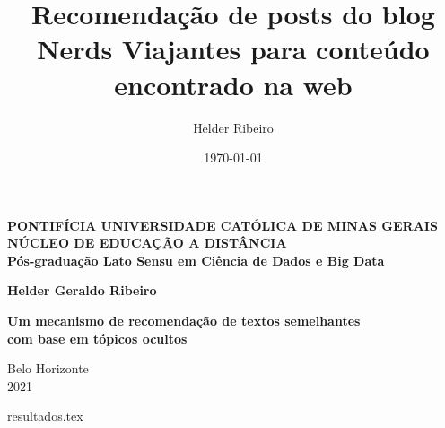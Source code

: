 \documentclass{article}
\title{Recomendação de posts do blog Nerds Viajantes para conteúdo encontrado na web}
\author{Helder Ribeiro}
\date{\today}
\begin{document}

\begin{comment}
\maketitle
\end{comment}

\begin{titlepage}
    \begin{center}
        \vspace*{1cm}

        \large
        \textbf{PONTIFÍCIA UNIVERSIDADE CATÓLICA DE MINAS GERAIS} \\
        \textbf{NÚCLEO DE EDUCAÇÃO A DISTÂNCIA} \\
        \textbf{Pós-graduação Lato Sensu em Ciência de Dados e Big Data} \\
 
        \vspace{2.5cm}
 
        \textbf{Helder Geraldo Ribeiro}
  
        \vspace{1.5cm}
             
        \textbf{Um mecanismo de recomendação de textos semelhantes} \\ 
        \textbf{com base em tópicos ocultos} \\
             
        \vfill
             
        \normalsize
        Belo Horizonte\\
        2021\\
    \end{center}
\end{titlepage}

\pagebreak

\tableofcontents{}

{resultados.tex}

\begin{comment}
{treinamento.tex}


{apendice.tex}
\end{comment}
\end{document}
